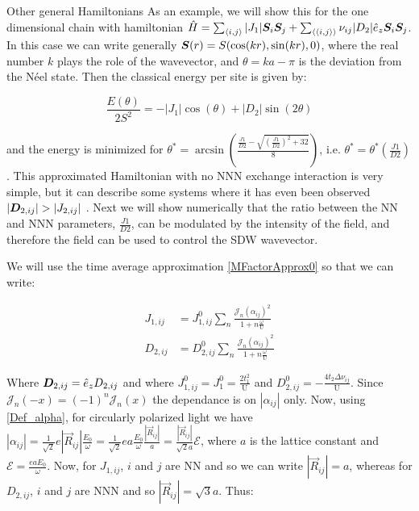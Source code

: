 \begin{section}{Other general Hamiltonians}
As an example, we will show this for the one dimensional chain with hamiltonian $\hat{H} = \sum_{\langle i,j \rangle} |J_1| \boldsymbol{S}_i\boldsymbol{S}_j + \sum_{\langle \langle i,j \rangle \rangle} \nu_{ij}|D_2|\hat{e}_z\boldsymbol{S}_i\boldsymbol{S}_j$. In this case we can write generally $\boldsymbol{S}(r) = S(\cos(kr), \sin(kr), 0)$, where the real number $k$ plays the role of the wavevector, and $\theta = ka-\pi$ is the deviation from the N\'eel state. Then the classical energy per site is given by:

\begin{equation}
\frac{E(\theta)}{2S^2} = -|J_1|\cos(\theta) + |D_2|\sin(2 \theta)
\end{equation}

and the energy is minimized for $\theta^* = \arcsin(\frac{\frac{J1}{D2} - \sqrt{(\frac{J1}{D2})^2+32}}{8})$, i.e. $\theta^* = \theta^*(\frac{J1}{D2})$. This approximated Hamiltonian with no NNN exchange interaction is very simple, but it can describe some systems where it has even been observed $|\boldsymbol{D}_{2,ij}| > |J_{2,ij}|$ \cite{Chen2018}. Next we will show numerically that the ratio between the NN and NNN parameters, $\frac{J1}{D2}$, can be modulated by the intensity of the field, and therefore the field can be used to control the SDW wavevector. 

We will use the time average approximation \ref{MFactorApprox0} so that we can write:

\begin{align}
J_{1,ij} &= J_{1,ij}^0  \sum_{n} \frac{\mathcal{J}_n(\alpha_{ij})^2}{1+n\frac{\omega}{\text{U}}} \\
D_{2,ij} &= D_{2,ij}^0  \sum_{n} \frac{\mathcal{J}_n(\alpha_{ij})^2}{1+n\frac{\omega}{\text{U}}}
\end{align}

Where $\boldsymbol{D}_{2,ij} = \hat{e}_z D_{2,ij}$ and where $J_{1,ij}^0 = J_{1}^0 = \frac{2t_1^2}{\text{U}}$ and $D_{2,ij}^0 = -\frac{4t_2\Delta\nu_{ij}}{\text{U}}$. Since $\mathcal{J}_n(-x) = (-1)^n\mathcal{J}_n(x)$ the dependance is on $|\alpha_{ij}|$ only. Now, using \ref{Def_alpha}, for circularly polarized light we have $|\alpha_{ij}| = \frac{1}{\sqrt{2}}e|\vec{R}_{ij}| \frac{E_0}{\omega} = \frac{1}{\sqrt{2}}ea \frac{E_0}{\omega} \frac{|\vec{R}_{ij}|}{a} = \frac{|\vec{R}_{ij}|}{\sqrt{2}a} \mathcal{E}$, where $a$ is the lattice constant and $\mathcal{E} = \frac{eaE_0}{\omega}$. Now, for $J_{1,ij}$, $i$ and $j$ are NN and so we can write $|\vec{R}_{ij}|=a$, whereas for $D_{2,ij}$, $i$ and $j$ are NNN and so $|\vec{R}_{ij}|=\sqrt{3}a$. Thus:


\end{section}
